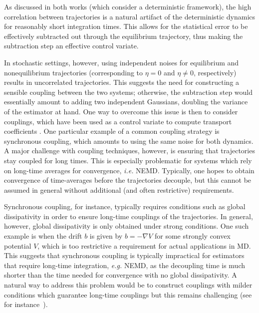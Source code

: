 As discussed in both works \cite{ciccotti75,ciccotti79} (which consider a deterministic framework), the high correlation between trajectories is a natural artifact of the deterministic dynamics for reasonably short integration times. This allows for the statistical error to be effectively subtracted out through the equilibrium trajectory, thus making the subtraction step an effective control variate.

In stochastic settings, however, using independent noises for equilibrium and nonequilibrium trajectories (corresponding to $\eta=0$ and $\eta\ne 0$, respectively) results in uncorrelated trajectories. This suggests the need for constructing a sensible coupling between the two systems; otherwise, the subtraction step would essentially amount to adding two independent Gaussians, doubling the variance of the estimator at hand. One way to overcome this issue is then to consider couplings, which have been used as a control variate to compute transport coefficients \cite{goodman2009,garnier2022}. One particular example of a common coupling strategy is synchronous coupling, which amounts to using the same noise for both dynamics. A major challenge with coupling techniques, however, is ensuring that trajectories stay coupled for long times.
This is especially problematic for systems which rely on long-time averages for convergence, \emph{i.e.} NEMD. Typically, one hopes to obtain convergence of time-averages before the trajectories decouple, but this cannot be assumed in general without additional (and often restrictive) requirements.

Synchronous coupling, for instance, typically requires conditions such as global dissipativity in order to ensure long-time couplings of the trajectories. In general, however, global dissipativity is only obtained under strong conditions. One such example is when the drift $b$ is given by $b=-\nabla V$ for some strongly convex potential $V$, which is too restrictive a requirement for actual applications in MD. This suggests that synchronous coupling is typically impractical for estimators that require long-time integration, \emph{e.g.} NEMD, as the decoupling time is much shorter than the time needed for convergence with no global dissipativity. A natural way to address this problem would be to construct couplings with milder conditions which guarantee long-time couplings but this remains challenging (see for instance~\cite{shiva}). %

